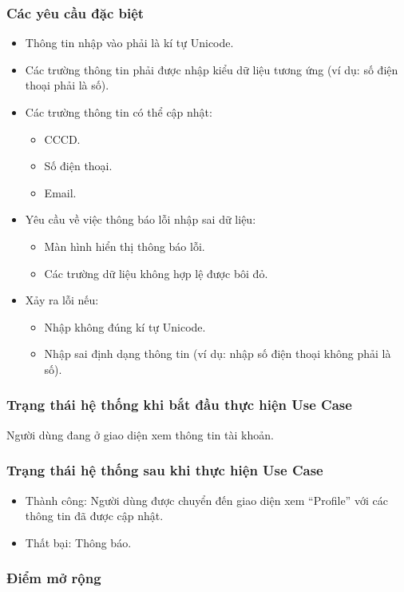 \subsubsection{Các yêu cầu đặc biệt}
\begin{itemize}
  \item Thông tin nhập vào phải là kí tự Unicode.
  \item Các trường thông tin phải được nhập kiểu dữ liệu tương ứng (ví dụ: số điện thoại phải là số).
  \item Các trường thông tin có thể cập nhật:
    \begin{itemize}
      \item CCCD.
      \item Số điện thoại.
      \item Email.
    \end{itemize}
  \item Yêu cầu về việc thông báo lỗi nhập sai dữ liệu:
    \begin{itemize}
      \item Màn hình hiển thị thông báo lỗi.
      \item Các trường dữ liệu không hợp lệ được bôi đỏ.
    \end{itemize}
  \item Xảy ra lỗi nếu:
    \begin{itemize}
      \item Nhập không đúng kí tự Unicode.
      \item Nhập sai định dạng thông tin (ví dụ: nhập số điện thoại không phải là số).
    \end{itemize}
\end{itemize}

\subsubsection{Trạng thái hệ thống khi bắt đầu thực hiện Use Case}
Người dùng đang ở giao diện xem thông tin tài khoản.

\subsubsection{Trạng thái hệ thống sau khi thực hiện Use Case}
\begin{itemize}
  \item Thành công: Người dùng được chuyển đến giao diện xem ``Profile'' với các thông tin đã được cập nhật.
  \item Thất bại: Thông báo.
\end{itemize}

\subsubsection{Điểm mở rộng}
